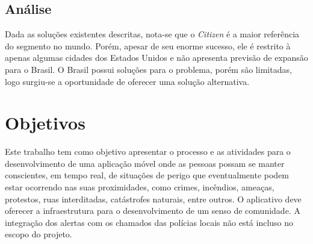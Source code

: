\subsection{Análise}

Dada as soluções existentes descritas, nota-se que o \emph{Citizen} é a maior referência do segmento no mundo. Porém, apesar de seu enorme sucesso, ele é restrito à apenas algumas cidades dos Estados Unidos e não apresenta previsão de expansão para o Brasil. O Brasil possui soluções para o problema, porém são limitadas, logo surgiu-se a oportunidade de oferecer uma solução alternativa.

\section{Objetivos}
\label{s.objetivos}



Este trabalho tem como objetivo apresentar o processo e as atividades para o desenvolvimento de uma aplicação móvel onde as pessoas possam se manter conscientes, em tempo real, de situações de perigo que eventualmente podem estar ocorrendo nas suas proximidades, como crimes, incêndios, ameaças, protestos, ruas interditadas, catástrofes naturais, entre outros. O aplicativo deve oferecer a infraestrutura para o desenvolvimento de um senso de comunidade. A integração dos alertas com os chamados das polícias locais não está incluso no escopo do projeto.
